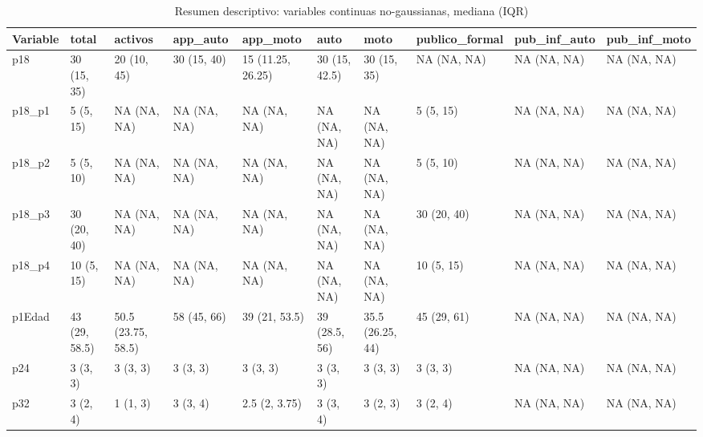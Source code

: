 \begin{table}

\caption{Resumen descriptivo: variables continuas no-gaussianas, mediana (IQR)}
\centering
\begin{tabular}[t]{l|l|l|l|l|l|l|l|l|l}
\hline
Variable & total & activos & app\_auto & app\_moto & auto & moto & publico\_formal & pub\_inf\_auto & pub\_inf\_moto\\
\hline
p18 & 30 (15, 35) & 20 (10, 45) & 30 (15, 40) & 15 (11.25, 26.25) & 30 (15, 42.5) & 30 (15, 35) & NA (NA, NA) & NA (NA, NA) & NA (NA, NA)\\
\hline
p18\_p1 & 5 (5, 15) & NA (NA, NA) & NA (NA, NA) & NA (NA, NA) & NA (NA, NA) & NA (NA, NA) & 5 (5, 15) & NA (NA, NA) & NA (NA, NA)\\
\hline
p18\_p2 & 5 (5, 10) & NA (NA, NA) & NA (NA, NA) & NA (NA, NA) & NA (NA, NA) & NA (NA, NA) & 5 (5, 10) & NA (NA, NA) & NA (NA, NA)\\
\hline
p18\_p3 & 30 (20, 40) & NA (NA, NA) & NA (NA, NA) & NA (NA, NA) & NA (NA, NA) & NA (NA, NA) & 30 (20, 40) & NA (NA, NA) & NA (NA, NA)\\
\hline
p18\_p4 & 10 (5, 15) & NA (NA, NA) & NA (NA, NA) & NA (NA, NA) & NA (NA, NA) & NA (NA, NA) & 10 (5, 15) & NA (NA, NA) & NA (NA, NA)\\
\hline
p1Edad & 43 (29, 58.5) & 50.5 (23.75, 58.5) & 58 (45, 66) & 39 (21, 53.5) & 39 (28.5, 56) & 35.5 (26.25, 44) & 45 (29, 61) & NA (NA, NA) & NA (NA, NA)\\
\hline
p24 & 3 (3, 3) & 3 (3, 3) & 3 (3, 3) & 3 (3, 3) & 3 (3, 3) & 3 (3, 3) & 3 (3, 3) & NA (NA, NA) & NA (NA, NA)\\
\hline
p32 & 3 (2, 4) & 1 (1, 3) & 3 (3, 4) & 2.5 (2, 3.75) & 3 (3, 4) & 3 (2, 3) & 3 (2, 4) & NA (NA, NA) & NA (NA, NA)\\
\hline
\end{tabular}
\end{table}

